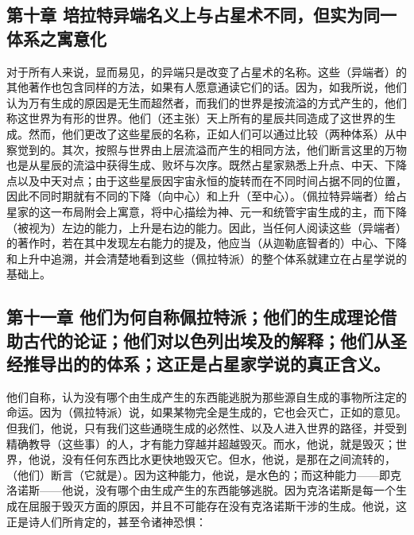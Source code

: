 
\subsection{第十章 培拉特异端名义上与占星术不同，但实为同一体系之寓意化}

对于所有人来说，显而易见，的异端只是改变了占星术的名称。这些（异端者）的其他著作也包含同样的方法，如果有人愿意通读它们的话。因为，如我所说，他们认为万有生成的原因是无生而超然者，而我们的世界是按流溢的方式产生的，他们称这世界为有形的世界。他们（还主张）天上所有的星辰共同造成了这世界的生成。然而，他们更改了这些星辰的名称，正如人们可以通过比较（两种体系）从中察觉到的。其次，按照与世界由上层流溢而产生的相同方法，他们断言这里的万物也是从星辰的流溢中获得生成、败坏与次序。既然占星家熟悉上升点、中天、下降点以及中天对点；由于这些星辰因宇宙永恒的旋转而在不同时间占据不同的位置，因此不同时期就有不同的下降（向中心）和上升（至中心）。（佩拉特异端者）给占星家的这一布局附会上寓意，将中心描绘为神、元一和统管宇宙生成的主，而下降（被视为）左边的能力，上升是右边的能力。因此，当任何人阅读这些（异端者）的著作时，若在其中发现左右能力的提及，他应当（从迦勒底智者的）中心、下降和上升中追溯，并会清楚地看到这些（佩拉特派）的整个体系就建立在占星学说的基础上。\par


\subsection{第十一章   他们为何自称佩拉特派；他们的生成理论借助古代的论证；他们对以色列出埃及的解释；他们从圣经推导出的的体系；这正是占星家学说的真正含义。}

他们自称，认为没有哪个由生成产生的东西能逃脱为那些源自生成的事物所注定的命运。因为（佩拉特派）说，如果某物完全是生成的，它也会灭亡，正如的意见。但我们，他说，只有我们这些通晓生成的必然性、以及人进入世界的路径，并受到精确教导（这些事）的人，才有能力穿越并超越毁灭。而水，他说，就是毁灭；世界，他说，没有任何东西比水更快地毁灭它。但水，他说，是那在之间流转的，（他们）断言（它就是）。因为这种能力，他说，是水色的；而这种能力——即克洛诺斯——他说，没有哪个由生成产生的东西能够逃脱。因为克洛诺斯是每一个生成在屈服于毁灭方面的原因，并且不可能存在没有克洛诺斯干涉的生成。他说，这正是诗人们所肯定的，甚至令诸神恐惧：\par

